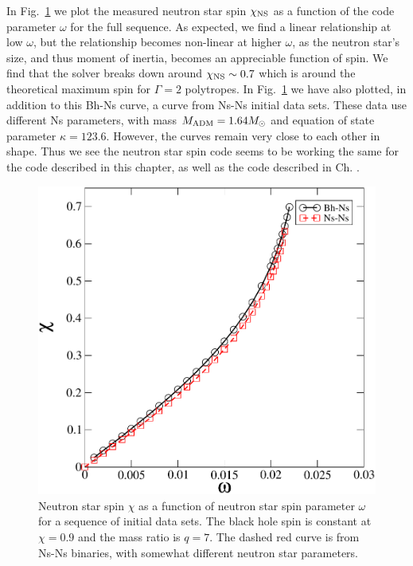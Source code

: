 In Fig.~\ref{fig:ChiVOmega} we plot the
measured neutron star spin $\chi_{\rm NS}$ as a function of the code
parameter $\omega$ for the full sequence. As expected, we find a linear
relationship at low $\omega$, but the relationship becomes non-linear
at higher $\omega$, as the neutron star's size, and thus moment of
inertia, becomes an appreciable function of spin. We find that the
solver breaks down around $\chi_{\rm NS}\sim 0.7$ which is around the
theoretical maximum spin for $\Gamma=2$ polytropes. In
Fig.~\ref{fig:ChiVOmega} we have also plotted, in addition to this
Bh-Ns curve, a curve from Ns-Ns initial data sets. These data use
different Ns parameters, with mass $M_{\rm ADM}=1.64M_{\odot}$ and
equation of state parameter $\kappa=123.6$. However, the curves remain
very close to each other in shape. Thus we see the neutron star spin
code seems to be working the same for the code described in this
chapter, as well as the code described in Ch. .

\begin{figure}
\includegraphics[width=0.95\columnwidth]{chap4/chiVOmega}
\caption[$\chi_{\rm NS}$ as a function of $\omega_{\rm NS}$ for bh-ns
binaries]
{\label{fig:ChiVOmega}
Neutron star spin $\chi$ as a function of neutron star spin parameter
$\omega$ for a sequence of initial data sets. The black hole spin is
constant at $\chi=0.9$ and the mass ratio is $q=7$. The dashed red curve is
from Ns-Ns binaries, with somewhat different neutron star parameters.}
\end{figure}

